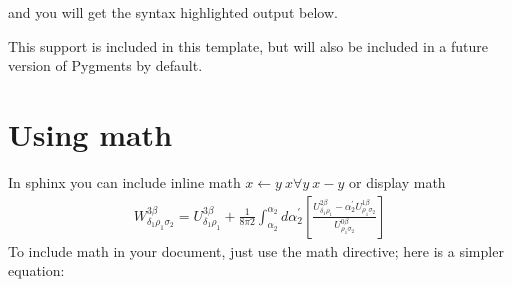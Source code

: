 \documentclass[letterpaper,10pt,english]{sphinxmanual}
\begin{document}
and you will get the syntax highlighted output below.

\begin{sphinxVerbatim}[commandchars=\\\{\}]
 \PYG{p}{[}\PYG{p}{]}   \PYG{p}{[}\PYG{p}{]}

 \PYG{p}{[}\PYG{p}{]} 
   
   \PYG{p}{[}  \PYG{p}{]}
     \PYG{p}{[}  \PYG{p}{]}
\end{sphinxVerbatim}

This support is included in this template, but will also be included
in a future version of Pygments by default.


\section{Using math}
\label{\detokenize{chapter2:using-math}}\label{\detokenize{chapter2:id1}}
In sphinx you can include inline math \(x\leftarrow y\ x\forall
y\ x-y\) or display math
\begin{equation*}
\begin{split}W^{3\beta}_{\delta_1 \rho_1 \sigma_2} = U^{3\beta}_{\delta_1 \rho_1} + \frac{1}{8 \pi 2} \int^{\alpha_2}_{\alpha_2} d \alpha^\prime_2 \left[\frac{ U^{2\beta}_{\delta_1 \rho_1} - \alpha^\prime_2U^{1\beta}_{\rho_1 \sigma_2} }{U^{0\beta}_{\rho_1 \sigma_2}}\right]\end{split}
\end{equation*}
To include math in your document, just use the math directive; here is
a simpler equation:

\begin{sphinxVerbatim}[commandchars=\\\{\}]
 

  \PYGZbs{}\PYGZbs{} \PYGZbs{} \PYGZbs{} \PYGZbs{} \PYGZbs{}\PYGZbs{} \PYGZbs{}
\end{sphinxVerbatim}
\end{document}
